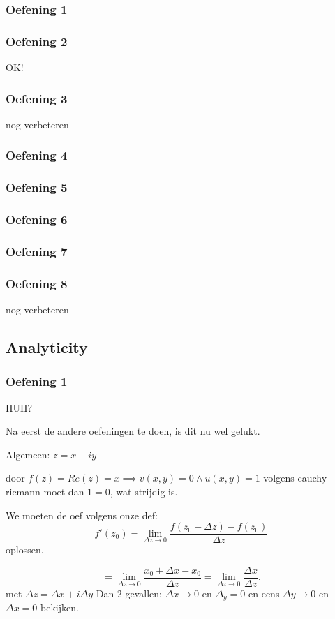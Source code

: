\documentclass[a4paper,twoside]{article}
\theoremstyle{definition}
\theoremstyle{plain}
\begin{document}
\subsubsection{Oefening 1}
\subsubsection{Oefening 2}
OK!
\subsubsection{Oefening 3}
nog verbeteren
\subsubsection{Oefening 4}

\subsubsection{Oefening 5}
\subsubsection{Oefening 6}
\subsubsection{Oefening 7}
\subsubsection{Oefening 8}
nog verbeteren
\subsection{Analyticity}
\subsubsection{Oefening 1}
HUH?

Na eerst de andere oefeningen te doen, is dit nu wel gelukt.

Algemeen: \(z = x+iy\)

door \(f(z) = Re(z) = x \implies v(x,y) = 0 \land u(x,y) = 1 \)
volgens cauchy-riemann moet dan \(1 = 0\), wat strijdig is.

We moeten de oef volgens onze def:
\[
f'(z_0) = \lim_{\Delta z \to 0} \frac{f(z_0 + \Delta z) - f(z_0)}{\Delta z}
\]
oplossen.

\[
= \lim_{\Delta z \to 0} \frac{x_0 + \Delta x - x_0}{\Delta z}
= \lim_{\Delta z \to 0} \frac{\Delta x}{\Delta z}.
\]
met \(\Delta z = \Delta x + i \Delta y\)
Dan 2 gevallen: \(\Delta x \to 0\) en \(\Delta_y = 0\)  en eens \( \Delta y \to 0 \) en \(\Delta x = 0\) bekijken.
\end{document}
